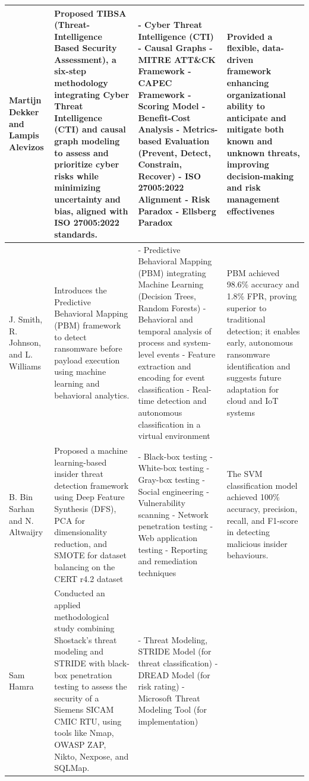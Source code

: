 \documentclass[12pt,a4paper]{report}
\begin{document}
\begin{table}[H]
\begin{tabularx}{\textwidth}{|l|l|l|l|}
\hline
[8] Martijn Dekker and Lampis Alevizos & Proposed TIBSA (Threat-Intelligence Based Security Assessment), a six-step methodology integrating Cyber Threat Intelligence (CTI) and causal graph modeling to assess and prioritize cyber risks while minimizing uncertainty and bias, aligned with ISO 27005:2022 standards. & - Cyber Threat Intelligence (CTI)
- Causal Graphs
- MITRE ATT\&CK Framework
- CAPEC Framework
- Scoring Model 
- Benefit-Cost Analysis
- Metrics-based Evaluation (Prevent, Detect, Constrain, Recover)
- ISO 27005:2022 Alignment
- Risk Paradox
- Ellsberg Paradox & Provided a flexible, data-driven framework enhancing organizational ability to anticipate and mitigate both known and unknown threats, improving decision-making and risk management effectivenes \\
\hline
[9] J. Smith, R. Johnson, and L. Williams & Introduces the Predictive Behavioral Mapping (PBM) framework to detect ransomware before payload execution using machine learning and behavioral analytics. & - Predictive Behavioral Mapping (PBM) integrating Machine Learning (Decision Trees, Random Forests)
- Behavioral and temporal analysis of process and system-level events
- Feature extraction and encoding for event classification
- Real-time detection and autonomous classification in a virtual environment & PBM achieved 98.6\% accuracy and 1.8\% FPR, proving superior to traditional detection; it enables early, autonomous ransomware identification and suggests future adaptation for cloud and IoT systems \\
\hline
[10] B. Bin Sarhan and N. Altwaijry & Proposed a machine learning-based insider threat detection framework using Deep Feature Synthesis (DFS), PCA for dimensionality reduction, and SMOTE for dataset balancing on the CERT r4.2 dataset & - Black-box testing
- White-box testing
- Gray-box testing
- Social engineering
- Vulnerability scanning
- Network penetration testing
- Web application testing
- Reporting and remediation techniques & The SVM classification model achieved 100\% accuracy, precision, recall, and F1-score in detecting malicious insider behaviours. \\
\hline
[11] Sam Hamra & Conducted an applied methodological study combining Shostack’s threat modeling and STRIDE with black-box penetration testing to assess the security of a Siemens SICAM CMIC RTU, using tools like Nmap, OWASP ZAP, Nikto, Nexpose, and SQLMap. & - Threat Modeling, STRIDE Model (for threat classification)
- DREAD Model (for risk rating)
- Microsoft Threat Modeling Tool (for implementation)

\end{tabularx}
\end{table}
\end{document}
